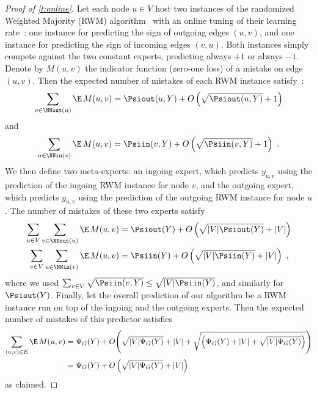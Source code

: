 \begin{proof}[Proof of \autoref{t:online}]

Let each node $u \in V$ host two instances of the randomized Weighted Majority (RWM)
algorithm~\cite{LittlestoneWa94} with an online tuning of their learning rate~\cite{cb+97,acg02}:
one instance for predicting the sign of outgoing edges $(u,v)$, and one instance for predicting the
sign of incoming edges $(v,u)$. Both instances simply compete against the two constant experts,
predicting always $+1$ or always $-1$. Denote by $M(u,v)$ the indicator function (zero-one loss) of
a mistake on edge $(u,v)$. Then the expected number of mistakes of each RWM instance
satisfy~\cite{cb+97,acg02}:
\[
    \sum_{v \in \NNout(u)} \E\,M(u,v) = \Psiout(u,Y) + O\left(\sqrt{\Psiout(u,Y)}+ 1\right)
\]
and
\[
    \sum_{u \in \NNin(v)} \E\,M(u,v) = \Psiin(v,Y) + O\left(\sqrt{\Psiin(v,Y)} + 1\right)~.
\]
We then define two meta-experts: an ingoing expert, which predicts $y_{u,v}$ using the prediction of
the ingoing RWM instance for node $v$, and the outgoing expert, which predicts $y_{u,v}$ using the
prediction of the outgoing RWM instance for node $u$.
The number of mistakes of these two experts satisfy
\begin{align*}
  \sum_{u \in V}\sum_{v \in \NNout(u)} \E\,M(u,v)
                                       &= \Psiout(Y) + O\left(\sqrt{|V|\Psiout(Y)} + |V|\right)\\
  \sum_{v \in V}\sum_{u \in \NNin(v)} \E\,M(u,v)
                                      &= \Psiin(Y)  + O\left(\sqrt{|V|\Psiin(Y)}  + |V|\right)~,
\end{align*}
where we used $\sum_{v \in V} \sqrt{\Psiin(v,Y)} \leq \sqrt{|V|\Psiin(Y)}$, and similarly for
$\Psiout(Y)$.
Finally, let the overall prediction of our algorithm be a RWM instance run on top of the ingoing and
the outgoing experts. Then the expected number of mistakes of this predictor satisfies~
\begin{align*}
  \sum_{(u,v) \in E} \E\,M(u,v) &= \Psi_G(Y) + O\Biggl(\sqrt{|V|\Psi_G(Y)} + |V|
    + \sqrt{\left(\Psi_G(Y) + |V| + \sqrt{|V|\Psi_G(Y)}\right)} \Biggl)\\
    &= \Psi_G(Y) + O\left(\sqrt{|V|\Psi_G(Y)} + |V|\right)
\end{align*}
as claimed.
\end{proof}

